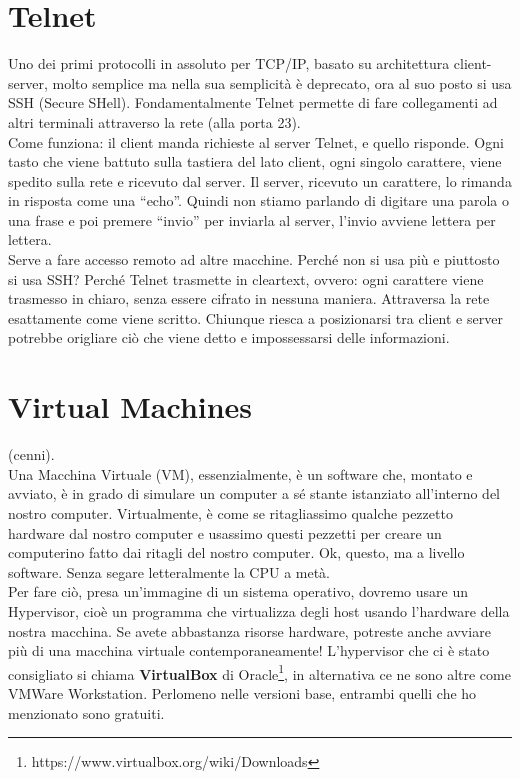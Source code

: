 \section*{\textcolor{RubineRed}{Telnet}}
\noindent Uno dei primi protocolli in assoluto per TCP/IP, basato su architettura client-server, molto semplice ma nella sua semplicità è deprecato, ora al suo posto si usa SSH (Secure SHell). Fondamentalmente Telnet permette di fare collegamenti ad altri terminali attraverso la rete (alla porta 23).\\

\noindent Come funziona: il client manda richieste al server Telnet, e quello risponde. Ogni tasto che viene battuto sulla tastiera del lato client, ogni singolo carattere, viene spedito sulla rete e ricevuto dal server. Il server, ricevuto un carattere, lo rimanda in risposta come una ``echo''. Quindi non stiamo parlando di digitare una parola o una frase e poi premere ``invio'' per inviarla al server, l'invio avviene lettera per lettera.\\Serve a fare accesso remoto ad altre macchine. Perché non si usa più e piuttosto si usa SSH? Perché Telnet trasmette in cleartext, ovvero: ogni carattere viene trasmesso in chiaro, senza essere cifrato in nessuna maniera. Attraversa la rete esattamente come viene scritto. Chiunque riesca a posizionarsi tra client e server potrebbe origliare ciò che viene detto e impossessarsi delle informazioni.

\section*{\textcolor{RedViolet}{Virtual Machines}}
\noindent (cenni).\\

\noindent Una Macchina Virtuale (VM), essenzialmente, è un software che, montato e avviato, è in grado di simulare un computer a sé stante istanziato all'interno del nostro computer. Virtualmente, è come se ritagliassimo qualche pezzetto hardware dal nostro computer e usassimo questi pezzetti per creare un computerino fatto dai ritagli del nostro computer. Ok, questo, ma a livello software. Senza segare letteralmente la CPU a metà.\\

\noindent Per fare ciò, presa un'immagine di un sistema operativo, dovremo usare un Hypervisor, cioè un programma che virtualizza degli host usando l'hardware della nostra macchina. Se avete abbastanza risorse hardware, potreste anche avviare più di una macchina virtuale contemporaneamente! L'hypervisor che ci è stato consigliato si chiama \textbf{VirtualBox} di Oracle\footnote{https://www.virtualbox.org/wiki/Downloads}, in alternativa ce ne sono altre come VMWare Workstation. Perlomeno nelle versioni base, entrambi quelli che ho menzionato sono gratuiti.

